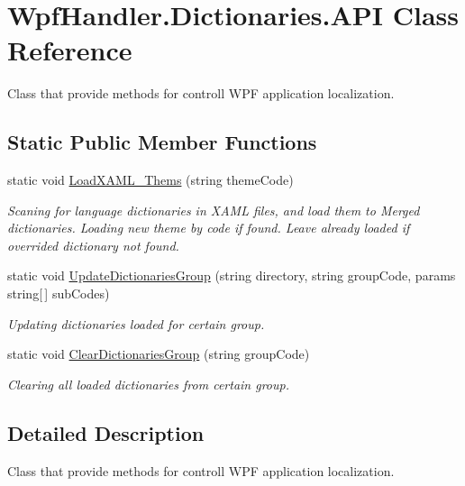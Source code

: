 \hypertarget{class_wpf_handler_1_1_dictionaries_1_1_a_p_i}{}\section{Wpf\+Handler.\+Dictionaries.\+A\+PI Class Reference}
\label{class_wpf_handler_1_1_dictionaries_1_1_a_p_i}


Class that provide methods for controll W\+PF application localization.  


\subsection*{Static Public Member Functions}
\begin{DoxyCompactItemize}
\item 
static void \mbox{\hyperlink{class_wpf_handler_1_1_dictionaries_1_1_a_p_i_ac9aafbe351f06f0c20de39508d3e8852}{Load\+X\+A\+M\+L\+\_\+\+Thems}} (string theme\+Code)
\begin{DoxyCompactList}\small\item\em Scaning for language dictionaries in X\+A\+ML files, and load them to Merged dictionaries. Loading new theme by code if found. Leave already loaded if overrided dictionary not found. \end{DoxyCompactList}\item 
static void \mbox{\hyperlink{class_wpf_handler_1_1_dictionaries_1_1_a_p_i_a0de06b29ec542383dbdc470bb9a7c98e}{Update\+Dictionaries\+Group}} (string directory, string group\+Code, params string\mbox{[}$\,$\mbox{]} sub\+Codes)
\begin{DoxyCompactList}\small\item\em Updating dictionaries loaded for certain group. \end{DoxyCompactList}\item 
static void \mbox{\hyperlink{class_wpf_handler_1_1_dictionaries_1_1_a_p_i_a2611ee5407fe0a4cde1a2490a54d759e}{Clear\+Dictionaries\+Group}} (string group\+Code)
\begin{DoxyCompactList}\small\item\em Clearing all loaded dictionaries from certain group. \end{DoxyCompactList}\end{DoxyCompactItemize}


\subsection{Detailed Description}
Class that provide methods for controll W\+PF application localization. 



